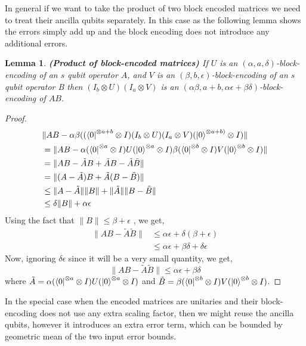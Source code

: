 \documentclass[12pt, oneside]{book}
\newtheorem{lemma}[theorem]{Lemma}
\theoremstyle{definition}
\theoremstyle{definition}
\theoremstyle{remark}
\begin{document}
In general if we want to take the product of two block encoded matrices we need to treat their ancilla qubits separately. In this case as the following lemma shows the errors simply add up and the block encoding does not introduce any additional errors.
\begin{lemma}
    \textbf{(Product of block-encoded matrices)}
    If $U$ is an $(\alpha,a,\delta)$-block-encoding of an $s$ qubit operator $A$, and $V$ is an $(\beta,b,\epsilon)$-block-encoding of an $s$ qubit operator B then $(I_b\otimes U)(I_a\otimes V)$ is an $(\alpha\beta,a+b,\alpha\epsilon+\beta\delta)$-block-encoding of $AB$.
\end{lemma}
\begin{proof}
    \begin{align*}
        &\|AB-\alpha\beta((\bra{0}^{\otimes a+b}\otimes I)(I_b\otimes U)(I_a\otimes V)(\ket{0}^{\otimes a+b)}\otimes I)\|\\
        &=\|AB-\alpha(\bra{0}^{\otimes a}\otimes I)U(\ket{0}^{\otimes a}\otimes I)\beta(\bra{0}^{\otimes b}\otimes I)V(\ket{0}^{\otimes b}\otimes I)\|\\
        &=\|AB-\tilde{A}B+\tilde{A}B-\tilde{A}\tilde{B}\|\\
        &=\|(A-\tilde{A})B+\tilde{A}(B-\tilde{B})\|\\
        &\leq \|A-\tilde{A}\|\|B\| +\|\tilde{A}\| \|B-\tilde{B}\|\\
        &\leq \delta \|B\|+ \alpha \epsilon
    \end{align*}
    Using the fact that $\|B\| \leq \beta + \epsilon$ , we get,
    \begin{align*}
        \|AB-\tilde{A}\tilde{B}\| &\leq \alpha\epsilon+\delta(\beta+\epsilon)\\
        &\leq \alpha\epsilon + \beta\delta + \delta \epsilon
    \end{align*}
    Now, ignoring $\delta\epsilon$ since it will be a very small quantity, we get,
    \[
    \|AB-\tilde{A}\tilde{B}\|\leq \alpha\epsilon+\beta\delta
    \]
    where $\tilde{A}=\alpha(\bra{0}^{\otimes a}\otimes I)U(\ket{0}^{\otimes a}\otimes I)$ and $\tilde{B}=\beta(\bra{0}^{\otimes b}\otimes I)V(\ket{0}^{\otimes b}\otimes I)$.
\end{proof}
In the special case when the encoded matrices are unitaries and their block-encoding does not use any extra scaling factor, then we might reuse the ancilla qubits, however it introduces an extra error term, which can be bounded by geometric mean of the two input error bounds.
\end{document}

